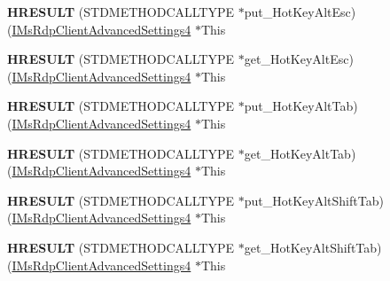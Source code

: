 \begin{DoxyCompactItemize}
{\bfseries H\+R\+E\+S\+U\+LT} (S\+T\+D\+M\+E\+T\+H\+O\+D\+C\+A\+L\+L\+T\+Y\+PE $\ast$put\+\_\+\+Hot\+Key\+Alt\+Esc)(\hyperlink{interface_m_s_t_s_c_lib_1_1_i_ms_rdp_client_advanced_settings4}{I\+Ms\+Rdp\+Client\+Advanced\+Settings4} $\ast$This
\item 
\mbox{\label{struct_m_s_t_s_c_lib_1_1_i_ms_rdp_client_advanced_settings4_vtbl_a2bfbb822a48f7675f59fd94c01c61e0b}} 
{\bfseries H\+R\+E\+S\+U\+LT} (S\+T\+D\+M\+E\+T\+H\+O\+D\+C\+A\+L\+L\+T\+Y\+PE $\ast$get\+\_\+\+Hot\+Key\+Alt\+Esc)(\hyperlink{interface_m_s_t_s_c_lib_1_1_i_ms_rdp_client_advanced_settings4}{I\+Ms\+Rdp\+Client\+Advanced\+Settings4} $\ast$This
\item 
\mbox{\label{struct_m_s_t_s_c_lib_1_1_i_ms_rdp_client_advanced_settings4_vtbl_a06a20da4fd0af32607e1bee1d9bfb091}} 
{\bfseries H\+R\+E\+S\+U\+LT} (S\+T\+D\+M\+E\+T\+H\+O\+D\+C\+A\+L\+L\+T\+Y\+PE $\ast$put\+\_\+\+Hot\+Key\+Alt\+Tab)(\hyperlink{interface_m_s_t_s_c_lib_1_1_i_ms_rdp_client_advanced_settings4}{I\+Ms\+Rdp\+Client\+Advanced\+Settings4} $\ast$This
\item 
\mbox{\label{struct_m_s_t_s_c_lib_1_1_i_ms_rdp_client_advanced_settings4_vtbl_a3893ed0f96e95922555e756943727ca7}} 
{\bfseries H\+R\+E\+S\+U\+LT} (S\+T\+D\+M\+E\+T\+H\+O\+D\+C\+A\+L\+L\+T\+Y\+PE $\ast$get\+\_\+\+Hot\+Key\+Alt\+Tab)(\hyperlink{interface_m_s_t_s_c_lib_1_1_i_ms_rdp_client_advanced_settings4}{I\+Ms\+Rdp\+Client\+Advanced\+Settings4} $\ast$This
\item 
\mbox{\label{struct_m_s_t_s_c_lib_1_1_i_ms_rdp_client_advanced_settings4_vtbl_a7ba26d5da36433b64765c946ed805ca0}} 
{\bfseries H\+R\+E\+S\+U\+LT} (S\+T\+D\+M\+E\+T\+H\+O\+D\+C\+A\+L\+L\+T\+Y\+PE $\ast$put\+\_\+\+Hot\+Key\+Alt\+Shift\+Tab)(\hyperlink{interface_m_s_t_s_c_lib_1_1_i_ms_rdp_client_advanced_settings4}{I\+Ms\+Rdp\+Client\+Advanced\+Settings4} $\ast$This
\item 
\mbox{\label{struct_m_s_t_s_c_lib_1_1_i_ms_rdp_client_advanced_settings4_vtbl_aad62806dc0bc4272635f8375cefaeb1c}} 
{\bfseries H\+R\+E\+S\+U\+LT} (S\+T\+D\+M\+E\+T\+H\+O\+D\+C\+A\+L\+L\+T\+Y\+PE $\ast$get\+\_\+\+Hot\+Key\+Alt\+Shift\+Tab)(\hyperlink{interface_m_s_t_s_c_lib_1_1_i_ms_rdp_client_advanced_settings4}{I\+Ms\+Rdp\+Client\+Advanced\+Settings4} $\ast$This

\end{DoxyCompactItemize}
